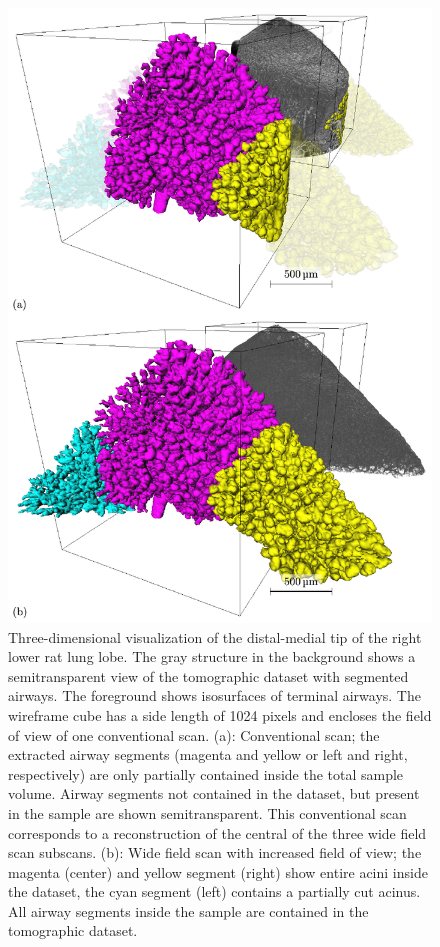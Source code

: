 \begin{figure}
	\centering
	\includegraphics[width=.7\linewidth]{img/Haberthuer2010/Fig05-ConvVsWfs}
	\caption[Three-dimensional visualization of the distal-medial tip of the right lower rat lung lobe]{Three-dimensional visualization of the distal-medial tip of the right lower rat lung lobe. The gray structure in the background shows a semitransparent view of the tomographic dataset with segmented airways. The foreground shows isosurfaces of terminal airways. The wireframe cube has a side length of 1024 pixels and encloses the field of view of one conventional scan. %
	(a): Conventional scan; the extracted airway segments (magenta and yellow or left and right, respectively) are only partially contained inside the total sample volume. Airway segments not contained in the dataset, but present in the sample are shown semitransparent. This conventional scan corresponds to a reconstruction of the central of the three wide field scan subscans. %
	(b): Wide field scan with increased field of view; the magenta (center) and yellow segment (right) show entire acini inside the dataset, the cyan segment (left) contains a partially cut acinus. All airway segments inside the sample are contained in the tomographic dataset.}
	\label{fig:s2-wfs}
\end{figure}

